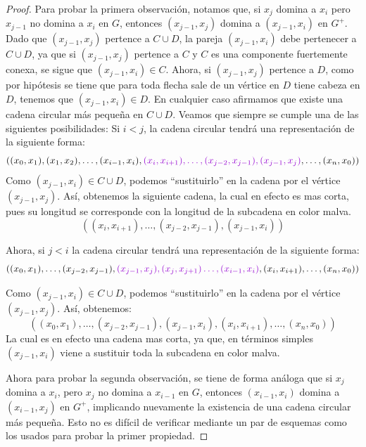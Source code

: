 \begin{proof}
Para probar la primera observaci\'on, notamos que, si $x_j$ domina a $x_i$ pero
$x_{j-1}$ no domina a $x_i$ en $G$, entonces $(x_{j-1},x_j)$ domina a
$(x_{j-1},x_i)$ en $G^+$. Dado que $(x_{j-1},x_j)$ pertence a $C\cup D$, la
pareja $(x_{j-1},x_i) $ debe pertenecer a $C\cup D$, ya que si $(x_{j-1},x_j)$
pertence a $C$ y $C$ es una componente fuertemente conexa, se sigue que
$(x_{j-1},x_i)\in C$. Ahora, si $(x_{j-1},x_j)$ pertence a $D$, como por
hip\'otesis se tiene que para toda flecha sale de un v\'ertice en $D$ tiene
cabeza en $D$, tenemos que $(x_{j-1},x_i)\in D$. En cualquier caso afirmamos que
existe una cadena circular m\'as pequeña en $C \cup D$. Veamos que siempre se
cumple una de las siguientes posibilidades: Si $i<j$, la cadena circular
tendr\'a una representaci\'on de la siguiente forma:
\[
  ( (x_0,x_1),(x_1,x_2),\dots, (x_{i-1},x_i), {\color{malva}(x_i,x_{i+1}),\dots,
  (x_{j-2},x_{j-1}),(x_{j-1},x_{j})}, \dots , (x_n,x_0))
\]
Como $(x_{j-1},x_i) \in C\cup D$, podemos ``sustituirlo'' en la cadena por el
v\'ertice $(x_{j-1},x_{j})$. Así, obtenemos la siguiente cadena, la cual en
efecto es mas corta, pues su longitud se corresponde con la longitud de la
subcadena en color malva.
\[
  ((x_i,x_{i+1}),\dots, (x_{j-2},x_{j-1}),(x_{j-1},x_i))
\]

Ahora, si $j<i$ la cadena circular tendr\'a una representaci\'on de la siguiente
forma:
$$( (x_0,x_1),\dots, (x_{j-2},x_{j-1}),
{\color{malva}(x_{j-1},x_j),(x_j,x_{j+1}) \dots,
(x_{i-1},x_{i})},(x_{i},x_{i+1}), \dots , (x_n,x_0))$$

Como $(x_{j-1},x_i) \in C \cup D$, podemos ``sustituirlo'' en la cadena por el
v\'ertice $(x_{j-1},x_{j})$. Así, obtenemos:
$$( (x_0,x_1),\dots, (x_{j-2},x_{j-1}), (x_{j-1},x_i),(x_{i},x_{i+1}), \dots ,
(x_n,x_0))$$ La cual es en efecto una cadena mas corta, ya que, en t\'erminos
simples $(x_{j-1},x_i)$ viene a sustituir toda la subcadena en color malva.

Ahora para probar la segunda observaci\'on, se tiene de forma an\'aloga que si
$x_j$ domina a $x_i$, pero $x_j$ no domina a $x_{i-1}$ en $G$, entonces
$(x_{i-1}, x_i)$ domina a $(x_{i-1}, x_j)$ en $G^+$, implicando nuevamente la
existencia de una cadena circular m\'as pequeña. Esto no es dif\'icil de
verificar mediante un par de esquemas como los usados para probar la primer
propiedad.



\end{proof}
